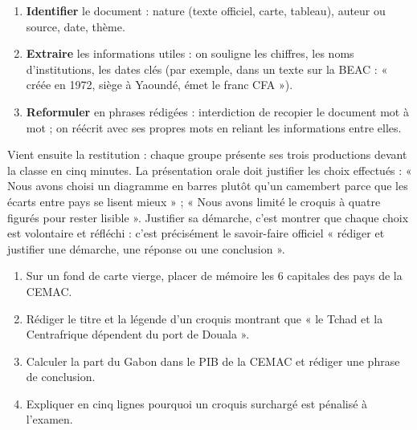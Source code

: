\documentclass[11pt]{article}
\newcommand{\cle}[1]{{\popxbold\color{popdark}#1}}
\begin{document}
\begin{enumerate}
\item \textbf{Identifier} le document : nature (texte officiel, carte, tableau), auteur ou source, date, thème.
\item \textbf{Extraire} les informations utiles : on souligne les chiffres, les noms d'institutions, les dates clés (par exemple, dans un texte sur la BEAC : « créée en 1972, siège à Yaoundé, émet le franc CFA »).
\item \textbf{Reformuler} en phrases rédigées : interdiction de recopier le document mot à mot ; on réécrit avec ses propres mots en reliant les informations entre elles.
\end{enumerate}

Vient ensuite la \cle{restitution} : chaque groupe présente ses trois productions devant la classe en cinq minutes. La présentation orale doit justifier les choix effectués : « Nous avons choisi un diagramme en barres plutôt qu'un camembert parce que les écarts entre pays se lisent mieux » ; « Nous avons limité le croquis à quatre figurés pour rester lisible ». Justifier sa démarche, c'est montrer que chaque choix est volontaire et réfléchi : c'est précisément le savoir-faire officiel « rédiger et justifier une démarche, une réponse ou une conclusion ».

\begin{exercice}
\begin{enumerate}
\item Sur un fond de carte vierge, placer de mémoire les 6 capitales des pays de la CEMAC.
\item Rédiger le titre et la légende d'un croquis montrant que « le Tchad et la Centrafrique dépendent du port de Douala ».
\item Calculer la part du Gabon dans le PIB de la CEMAC et rédiger une phrase de conclusion.
\item Expliquer en cinq lignes pourquoi un croquis surchargé est pénalisé à l'examen.
\end{enumerate}
\end{exercice}
\end{document}
